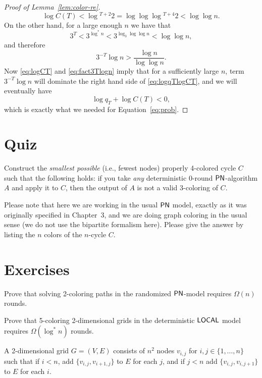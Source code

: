 \begin{proof}[Proof of Lemma~\ref{lem:color-re}]
\begin{equation}\label{eq:logCT}
	\log C(T) < \log {}^{T+2} 2 = \log \log \log {}^{T+4} 2 < \log \log n.
\end{equation}
On the other hand, for a large enough $n$ we have that
\[
	3^T < 3^{\log^* n} < 3^{\log_3 \log \log n} < \log \log n,
\]
and therefore
\begin{equation}\label{eq:fact3Tlogn}
	3^{-T} \log n > \frac{\log n}{\log \log n}.
\end{equation}
Now \eqref{eq:logCT} and \eqref{eq:fact3Tlogn} imply that for a sufficiently large $n$, term $3^{-T} \log n$ will dominate the right hand side of \eqref{eq:logqTlogCT}, and we will eventually have
\[
	\log q_T + \log C(T) < 0,
\]
which is exactly what we needed for Equation~\eqref{eq:prob}.
\end{proof}

\section{Quiz}
	
Construct the \emph{smallest possible} (i.e., fewest nodes) properly 4-colored cycle $C$ such that the following holds: if you take \emph{any} deterministic 0-round $\textup{\sffamily PN}$-algorithm $A$ and apply it to $C$, then the output of $A$ is not a valid 3-coloring of $C$.

Please note that here we are working in the usual $\textup{\sffamily PN}$ model, exactly as it was originally specified in Chapter~3, and we are doing graph coloring in the usual sense (we do not use the bipartite formalism here).
Please give the answer by listing the $n$ colors of the $n$-cycle $C$.

\section{Exercises}

\begin{ex}
	Prove that solving 2-coloring paths in the randomized $\textup{\sffamily PN}$-model requires $\Omega(n)$ rounds.
\end{ex}

\begin{ex}
	Prove that 5-coloring 2-dimensional grids in the deterministic $\textup{\sffamily LOCAL}$ model requires $\Omega(\log^* n)$ rounds.
	
	A 2-dimensional grid $G = (V,E)$ consists of $n^2$ nodes $v_{i,j}$ for $i,j \in \{1,\dots, n\}$ such that if $i < n$,  add $\{ v_{i,j}, v_{i+1,j} \}$ to $E$ for each $j$, and if $j < n$ add $\{v_{i,j},v_{i,j+1}\}$ to $E$ for each $i$.
\end{ex}

